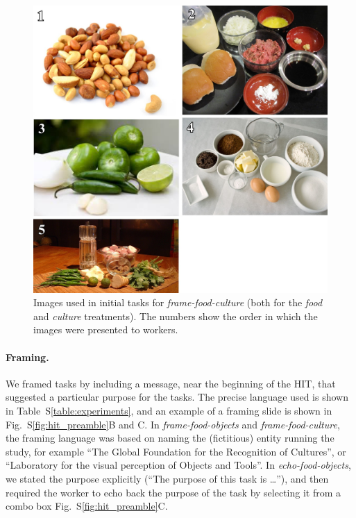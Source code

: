 \documentclass[12pt]{article}
\begin{document}
\begin{figure}
	\begin{center}
		\includegraphics{figs/task2-ingr.jpg}
	\end{center}
	\caption{
		Images used in initial tasks for \textit{frame-food-culture} 
		(both for the \textit{food} and \textit{culture} treatments).
		The numbers show the order in which the images were presented to 
		workers.
	}
	\label{fig:frame2:ingr}
\end{figure}

\paragraph{Framing.}
We framed tasks by including a message, near the beginning of the HIT, that 
suggested a particular purpose for the tasks.
The precise language used is shown in 
Table~S\ref{table:experiments}, and an example of a framing slide is shown in
Fig.~S\ref{fig:hit_preamble}B and C.  In \textit{frame-food-objects}
and \textit{frame-food-culture}, the framing language was based on
naming the (fictitious) entity running the study, for example
``The Global Foundation for the Recognition of Cultures'',
or ``Laboratory for the visual perception of Objects and Tools''.
In \textit{echo-food-objects}, we stated the purpose explicitly 
(``The purpose of this task is \dots''), and then required the worker to
echo back the purpose of the task by selecting it from a combo box
Fig.~S\ref{fig:hit_preamble}C.
\end{document}
